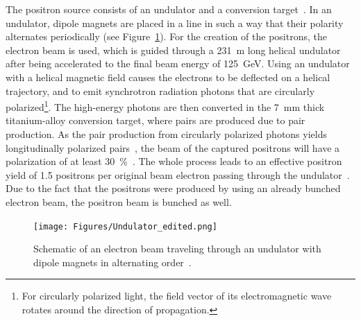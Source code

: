 The positron source consists of an undulator and a conversion target~\cite[p. 90f]{TDR32}.
In an undulator, dipole magnets are placed in a line in such a way that their polarity alternates periodically (see Figure~\ref{fig:Undulator}).
For the creation of the positrons, the electron beam is used, which is guided through a \SI{231}{\meter} long helical undulator after being accelerated to the final beam energy of \SI{125}{\GeV}.
Using an undulator with a helical magnetic field causes the electrons to be deflected on a helical trajectory, and to emit synchrotron radiation photons that are circularly polarized\footnote{For circularly polarized light, the field vector of its electromagnetic wave rotates around the direction of propagation.}.
The high-energy photons are then converted in the \SI{7}{\milli\meter} thick titanium-alloy conversion target, where \positron \electron pairs are produced due to pair production.
As the pair production from circularly polarized photons yields longitudinally polarized \positron \electron pairs~\cite{Polarization}, the beam of the captured positrons will have a polarization of at least \SI{30}{\percent}~\cite[p. 14]{TDR32}.
The whole process leads to an effective positron yield of 1.5 positrons per original beam electron passing through the undulator~\cite{Ushakov}.
Due to the fact that the positrons were produced by using an already bunched electron beam, the positron beam is bunched as well. 
\begin{figure}
\centering
\texttt{[image: Figures/Undulator\_edited.png]}
\caption[Schematic layout of an undulator]{Schematic of an electron beam traveling through an undulator with dipole magnets in alternating order~\cite[based on p. 41]{Wille}.}
\label{fig:Undulator}
\end{figure}

